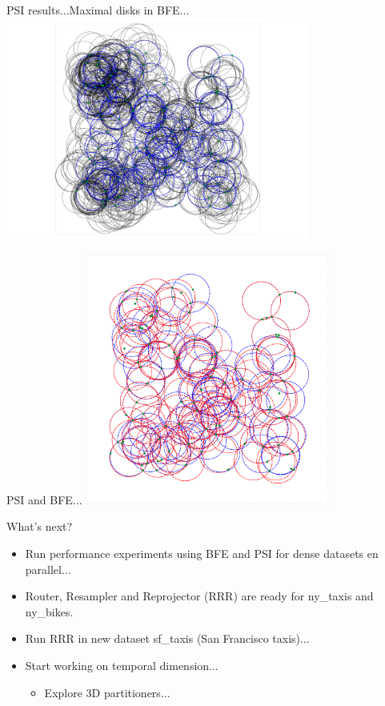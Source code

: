 \documentclass{beamer}
\begin{document}
\begin{frame}{PSI results...}{Maximal disks in BFE...}
    \centering
    \includegraphics[width=0.75\textwidth]{figures/psi8}
\end{frame}

\begin{frame}{PSI and BFE...}
    \centering
    \includegraphics[width=0.6\textwidth]{figures/psi9}
\end{frame}

\begin{frame}{What's next?}
  \begin{itemize}
          \item Run performance experiments using BFE and PSI for dense datasets en parallel...
          \item Router, Resampler and Reprojector (RRR) are ready for ny\_taxis and ny\_bikes.
          \item Run RRR in new dataset sf\_taxis (San Francisco taxis)...
          \item Start working on temporal dimension...
          \begin{itemize}
                  \item Explore 3D partitioners...
          \end{itemize}
  \end{itemize}

\end{frame}
\end{document}
